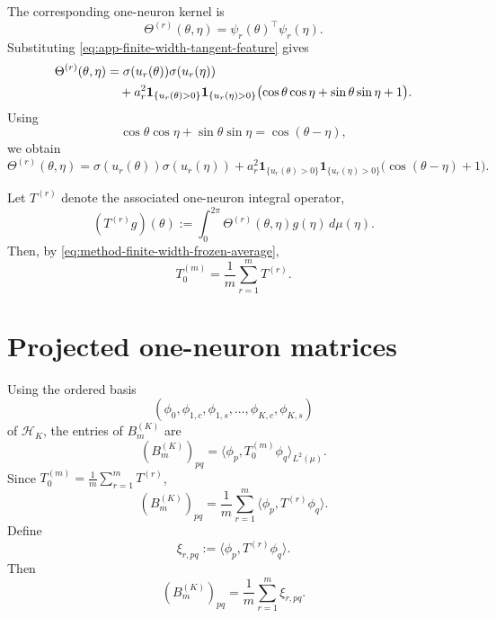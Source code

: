 The corresponding one-neuron kernel is
\begin{equation}
	\Theta^{(r)}(\theta,\eta)
	=
	\psi_r(\theta)^\top \psi_r(\eta).
	\label{eq:app-finite-width-one-neuron-kernel}
\end{equation}
Substituting \eqref{eq:app-finite-width-tangent-feature} gives
\begin{align}
	\Theta^{(r)}(\theta,\eta)
	 & =
	\sigma(u_r(\theta))\sigma(u_r(\eta)) \notag \\
	 & \quad
	+
	a_r^2
	\mathbf 1_{\{u_r(\theta)>0\}}
	\mathbf 1_{\{u_r(\eta)>0\}}
	\bigl(
	\cos\theta\cos\eta+\sin\theta\sin\eta+1
	\bigr).
	\label{eq:app-finite-width-kernel-expanded}
\end{align}
Using
\[
	\cos\theta\cos\eta+\sin\theta\sin\eta=\cos(\theta-\eta),
\]
we obtain
\begin{equation}
	\Theta^{(r)}(\theta,\eta)
	=
	\sigma(u_r(\theta))\sigma(u_r(\eta))
	+
	a_r^2
	\mathbf 1_{\{u_r(\theta)>0\}}
	\mathbf 1_{\{u_r(\eta)>0\}}
	\bigl(\cos(\theta-\eta)+1\bigr).
	\label{eq:app-finite-width-kernel-final}
\end{equation}

Let \(T^{(r)}\) denote the associated one-neuron integral operator,
\begin{equation}
	(T^{(r)}g)(\theta)
	:=
	\int_0^{2\pi}\Theta^{(r)}(\theta,\eta)g(\eta)\,d\mu(\eta).
	\label{eq:app-finite-width-one-neuron-operator}
\end{equation}
Then, by \eqref{eq:method-finite-width-frozen-average},
\[
	T_0^{(m)}=\frac1m\sum_{r=1}^m T^{(r)}.
\]

\section{Projected one-neuron matrices}
\label{sec:app-finite-width-projected-matrices}

Using the ordered basis
\[
	(\phi_0,\phi_{1,c},\phi_{1,s},\dots,\phi_{K,c},\phi_{K,s})
\]
of \(\mathcal H_K\), the entries of \(B_m^{(K)}\) are
\begin{equation}
	(B_m^{(K)})_{pq}
	=
	\langle \phi_p,T_0^{(m)}\phi_q\rangle_{L^2(\mu)}.
	\label{eq:app-finite-width-B-entry}
\end{equation}
Since \(T_0^{(m)}=\frac1m\sum_{r=1}^m T^{(r)}\),
\[
	(B_m^{(K)})_{pq}
	=
	\frac1m\sum_{r=1}^m
	\langle \phi_p,T^{(r)}\phi_q\rangle.
\]
Define
\begin{equation}
	\xi_{r,pq}:=\langle \phi_p,T^{(r)}\phi_q\rangle.
	\label{eq:app-finite-width-xi}
\end{equation}
Then
\begin{equation}
	(B_m^{(K)})_{pq}
	=
	\frac1m\sum_{r=1}^m \xi_{r,pq}.
	\label{eq:app-finite-width-B-average-entry}
\end{equation}

